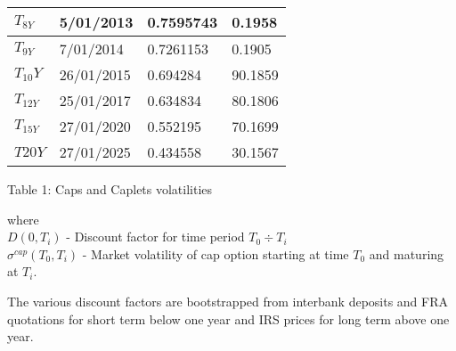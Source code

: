 \documentclass[11pt]{article}
\numberwithin{equation}{subsection}
\begin{document}
{\begin{tabular}{|l|l|l|l|}
		\hline
		\(T_{8Y}\)  &  5/01/2013  &  0.7595743  &  0.1958 \\
		\hline
		\(T_{9Y}\)  &  7/01/2014  &  0.7261153  &  0.1905 \\
		\hline
		\(T_{10}Y\)  &  26/01/2015 &  0.694284   &  90.1859 \\
		\hline
		\(T_{12Y}\)  &  25/01/2017 &  0.634834   &  80.1806 \\
		\hline
		\(T_{15Y}\)  &  27/01/2020 &  0.552195   &  70.1699 \\
		\hline
		\(T{20Y}\)  &  27/01/2025 &  0.434558   &  30.1567 \\
		\hline				 				
	\end{tabular}
	\begin{center}
			Table 1: Caps and Caplets volatilities
	\end{center}	
}
\vskip 0.4cm
where \\
\(D(0, T_i)\) - Discount factor for time period \(T_0 \div T_i\)\\
\(\sigma^{cap}(T_0, T_i)\) - Market volatility of cap option starting at time \(T_0\) and maturing at \(T_i\).


The various discount factors are bootstrapped from interbank deposits and FRA quotations
for short term below one year and IRS prices for long term above one year.
\end{document}
